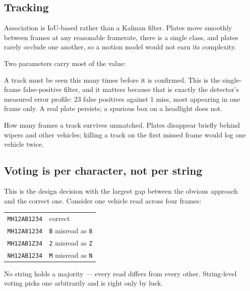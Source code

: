 \documentclass[11pt,a4paper]{article}
\begin{document}
\subsection{Tracking}

Association is IoU-based rather than a Kalman filter. Plates move smoothly
between frames at any reasonable framerate, there is a single class, and plates
rarely occlude one another, so a motion model would not earn its complexity.

Two parameters carry most of the value:

\begin{description}[leftmargin=1.2cm, style=nextline]
  \item[\texttt{min\_hits}] A track must be seen this many times before it is
    confirmed. This is the single-frame false-positive filter, and it matters
    because that is exactly the detector's measured error profile: 23 false
    positives against 1 miss, most appearing in one frame only. A real plate
    persists; a spurious box on a headlight does not.
  \item[\texttt{max\_age}] How many frames a track survives unmatched. Plates
    disappear briefly behind wipers and other vehicles; killing a track on the
    first missed frame would log one vehicle twice.
\end{description}

\subsection{Voting is per character, not per string}

This is the design decision with the largest gap between the obvious approach and
the correct one. Consider one vehicle read across four frames:

\begin{center}
\small
\begin{tabular}{@{}ll@{}}
\toprule
\texttt{MH12AB1234} & correct \\
\texttt{MH12A81234} & \texttt{B} misread as \texttt{8} \\
\texttt{MH12AB1Z34} & \texttt{2} misread as \texttt{Z} \\
\texttt{NH12AB1234} & \texttt{M} misread as \texttt{N} \\
\bottomrule
\end{tabular}
\end{center}

No string holds a majority --- every read differs from every other. String-level
voting picks one arbitrarily and is right only by luck.
\end{document}
